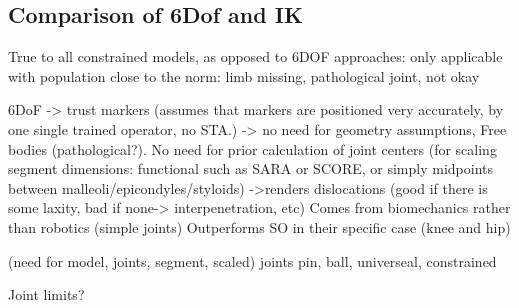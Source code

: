 \subsection{Comparison of 6Dof and IK}

True to all constrained models, as opposed to 6DOF approaches: only applicable with population close to the norm: limb missing, pathological joint, not okay

6DoF
-> trust markers (assumes that markers are positioned very accurately, by one single trained operator, no STA.)
-> no need for geometry assumptions, Free bodies (pathological?). No need for prior calculation of joint centers (for scaling segment dimensions: functional such as SARA or SCORE, or simply midpoints between malleoli/epicondyles/styloids)
->renders dislocations (good if there is some laxity, bad if none-> interpenetration, etc) Comes from biomechanics rather than robotics (simple joints)
Outperforms SO in their specific case (knee and hip) \cite{Lu1999}


(need for model, joints, segment, scaled) 
joints pin, ball, universeal, constrained

Joint limits?




